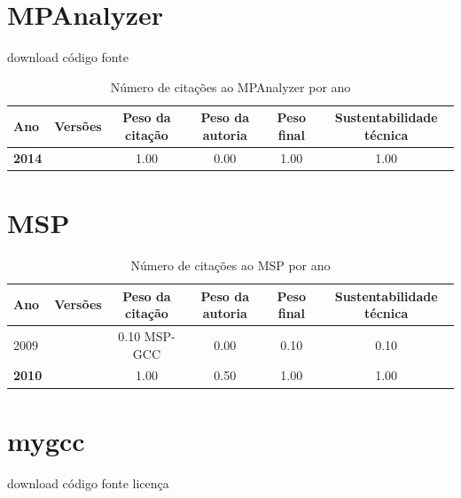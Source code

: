 \section{MPAnalyzer}
\checkmark download
\checkmark código fonte


\begin{table}[H]
\caption{Número de citações ao MPAnalyzer por ano}
\centering
\begin{tabular}{| l | c | c | c | c | c |}
  \hline
  Ano & Versões & Peso da citação & Peso da autoria & Peso final & Sustentabilidade técnica \\
  \hline
            {\bf 2014}
          &
          
          &
          1.00
          &
          0.00
          &
          1.00
          &
            {\color{blue} 1.00}
          \\
\hline
\end{tabular}
\end{table}



\section{MSP}


\begin{table}[H]
\caption{Número de citações ao MSP por ano}
\centering
\begin{tabular}{| l | c | c | c | c | c |}
  \hline
  Ano & Versões & Peso da citação & Peso da autoria & Peso final & Sustentabilidade técnica \\
  \hline
            2009
          &
          
          &
          0.10
            {\tiny MSP-GCC}
          &
          0.00
          &
          0.10
          &
            {\color{red} 0.10}
          \\
\hline
            {\bf 2010}
          &
          
          &
          1.00
          &
          0.50
          &
          1.00
          &
            {\color{blue} 1.00}
          \\
\hline
\end{tabular}
\end{table}



\section{mygcc}
\checkmark download
\checkmark código fonte
\checkmark licença


